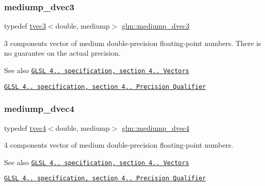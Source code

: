 \subsubsection{\texorpdfstring{mediump\+\_\+dvec3}{mediump\_dvec3}}
{\footnotesize\ttfamily typedef \hyperlink{structglm_1_1tvec3}{tvec3}$<$double, mediump$>$ \hyperlink{group__core__precision_ga4f6942e5a5c9f5dc5a0e1eed980d2ecd}{glm\+::mediump\+\_\+dvec3}}

3 components vector of medium double-\/precision floating-\/point numbers. There is no guarantee on the actual precision.

\begin{DoxySeeAlso}{See also}
\href{http://www.opengl.org/registry/doc/GLSLangSpec.4.20.8.pdf}{\tt G\+L\+SL 4.. specification, section 4.. Vectors} 

\href{http://www.opengl.org/registry/doc/GLSLangSpec.4.20.8.pdf}{\tt G\+L\+SL 4.. specification, section 4.. Precision Qualifier} 
\end{DoxySeeAlso}
\mbox{\label{group__core__precision_gaf685121e70f851b16581c154d8b27679}} 
\subsubsection{\texorpdfstring{mediump\+\_\+dvec4}{mediump\_dvec4}}
{\footnotesize\ttfamily typedef \hyperlink{structglm_1_1tvec4}{tvec4}$<$double, mediump$>$ \hyperlink{group__core__precision_gaf685121e70f851b16581c154d8b27679}{glm\+::mediump\+\_\+dvec4}}

4 components vector of medium double-\/precision floating-\/point numbers.

\begin{DoxySeeAlso}{See also}
\href{http://www.opengl.org/registry/doc/GLSLangSpec.4.20.8.pdf}{\tt G\+L\+SL 4.. specification, section 4.. Vectors} 

\href{http://www.opengl.org/registry/doc/GLSLangSpec.4.20.8.pdf}{\tt G\+L\+SL 4.. specification, section 4.. Precision Qualifier} 
\end{DoxySeeAlso}
\mbox{\label{group__core__precision_gac785826c039fe6c97c03b37c81c1a68e}} 
